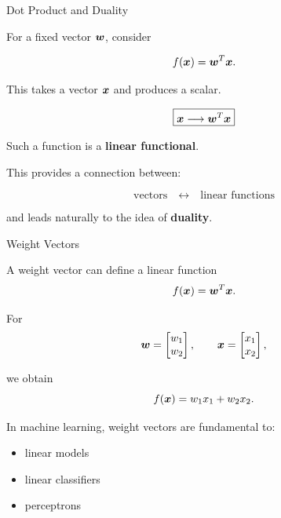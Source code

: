 \begin{frame}{Dot Product and Duality}

For a fixed vector $\bm{w}$, consider

\[
f(\bm{x})
=
\bm{w}^{T}\bm{x}.
\]

This takes a vector $\bm{x}$ and produces a scalar.

\vspace{0.4cm}

\[
\boxed{
\bm{x}
\longrightarrow
\bm{w}^{T}\bm{x}
}
\]

Such a function is a \textbf{linear functional}.

\vspace{0.4cm}

This provides a connection between:

\[
\boxed{
\text{vectors}
\quad\longleftrightarrow\quad
\text{linear functions}
}
\]

and leads naturally to the idea of \textbf{duality}.

\end{frame}



\begin{frame}{Weight Vectors}

A weight vector can define a linear function
\[
f(\bm{x})
=
\bm{w}^{T}\bm{x}.
\]

For
\[
\bm{w}
=
\begin{bmatrix}
w_1\\
w_2
\end{bmatrix},
\qquad
\bm{x}
=
\begin{bmatrix}
x_1\\
x_2
\end{bmatrix},
\]

we obtain
\[
f(\bm{x})
=
w_1x_1+w_2x_2.
\]

In machine learning, weight vectors are fundamental to:

\begin{itemize}
    \item linear models
    \item linear classifiers
    \item perceptrons
\end{itemize}

\end{frame}



